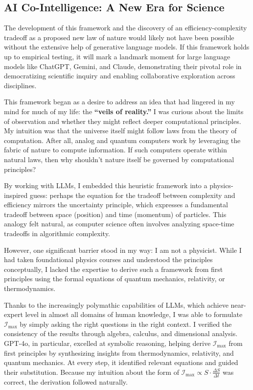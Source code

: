 \documentclass[12pt]{article}
\begin{document}
\subsection*{AI Co-Intelligence: A New Era for Science}

The development of this framework and the discovery of an efficiency-complexity tradeoff as a proposed new law of nature would likely not have been possible without the extensive help of generative language models. If this framework holds up to empirical testing, it will mark a landmark moment for large language models like ChatGPT, Gemini, and Claude, demonstrating their pivotal role in democratizing scientific inquiry and enabling collaborative exploration across disciplines.

This framework began as a desire to address an idea that had lingered in my mind for much of my life: the \textbf{``veils of reality.''} I was curious about the limits of observation and whether they might reflect deeper computational principles. My intuition was that the universe itself might follow laws from the theory of computation. After all, analog and quantum computers work by leveraging the fabric of nature to compute information. If such computers operate within natural laws, then why shouldn’t nature itself be governed by computational principles?

By working with LLMs, I embedded this heuristic framework into a physics-inspired guess: perhaps the equation for the tradeoff between complexity and efficiency mirrors the uncertainty principle, which expresses a fundamental tradeoff between space (position) and time (momentum) of particles. This analogy felt natural, as computer science often involves analyzing space-time tradeoffs in algorithmic complexity.

However, one significant barrier stood in my way: I am not a physicist. While I had taken foundational physics courses and understood the principles conceptually, I lacked the expertise to derive such a framework from first principles using the formal equations of quantum mechanics, relativity, or thermodynamics.

Thanks to the increasingly polymathic capabilities of LLMs, which achieve near-expert level in almost all domains of human knowledge, I was able to formulate \(\mathcal{I}_{\text{max}}\) by simply asking the right questions in the right context. I verified the consistency of the results through algebra, calculus, and dimensional analysis. GPT-4o, in particular, excelled at symbolic reasoning, helping derive \(\mathcal{I}_{\text{max}}\) from first principles by synthesizing insights from thermodynamics, relativity, and quantum mechanics. At every step, it identified relevant equations and guided their substitution. Because my intuition about the form of \(\mathcal{I}_{\text{max}} \propto S \cdot \frac{\Delta S}{\Delta t}\) was correct, the derivation followed naturally.
\end{document}
